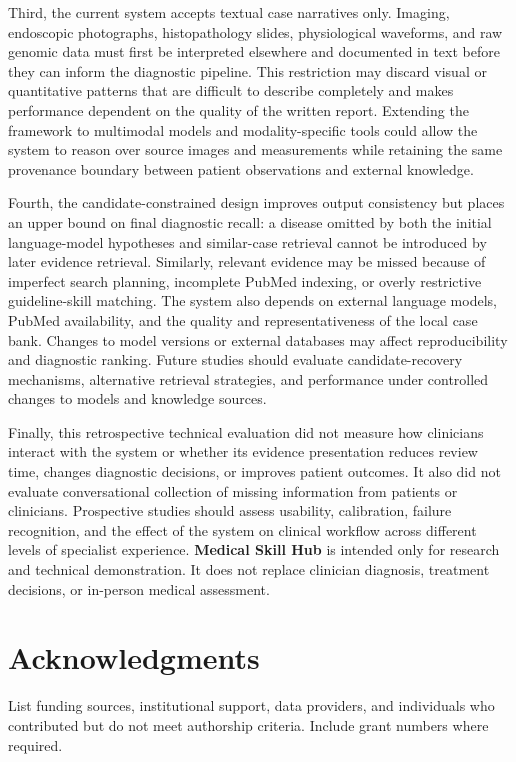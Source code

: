 \documentclass[10pt,letterpaper]{article}
\newcommand{\systemname}{\textbf{Medical Skill Hub}}
\begin{document}
Third, the current system accepts textual case narratives only. Imaging,
endoscopic photographs, histopathology slides, physiological waveforms, and raw
genomic data must first be interpreted elsewhere and documented in text before
they can inform the diagnostic pipeline. This restriction may discard visual or
quantitative patterns that are difficult to describe completely and makes
performance dependent on the quality of the written report. Extending the
framework to multimodal models and modality-specific tools could allow the
system to reason over source images and measurements while retaining the same
provenance boundary between patient observations and external knowledge.

Fourth, the candidate-constrained design improves output consistency but places
an upper bound on final diagnostic recall: a disease omitted by both the initial
language-model hypotheses and similar-case retrieval cannot be introduced by
later evidence retrieval. Similarly, relevant evidence may be missed because of
imperfect search planning, incomplete PubMed indexing, or overly restrictive
guideline-skill matching. The system also depends on external language models,
PubMed availability, and the quality and representativeness of the local case
bank. Changes to model versions or external databases may affect reproducibility
and diagnostic ranking. Future studies should evaluate candidate-recovery
mechanisms, alternative retrieval strategies, and performance under controlled
changes to models and knowledge sources.

Finally, this retrospective technical evaluation did not measure how clinicians
interact with the system or whether its evidence presentation reduces review
time, changes diagnostic decisions, or improves patient outcomes. It also did
not evaluate conversational collection of missing information from patients or
clinicians. Prospective studies should assess usability, calibration, failure
recognition, and the effect of the system on clinical workflow across different
levels of specialist experience. \systemname{} is intended only for research and
technical demonstration. It does not replace clinician diagnosis, treatment
decisions, or in-person medical assessment.

\section{Acknowledgments}

List funding sources, institutional support, data providers, and individuals who
contributed but do not meet authorship criteria. Include grant numbers where
required.
\end{document}
